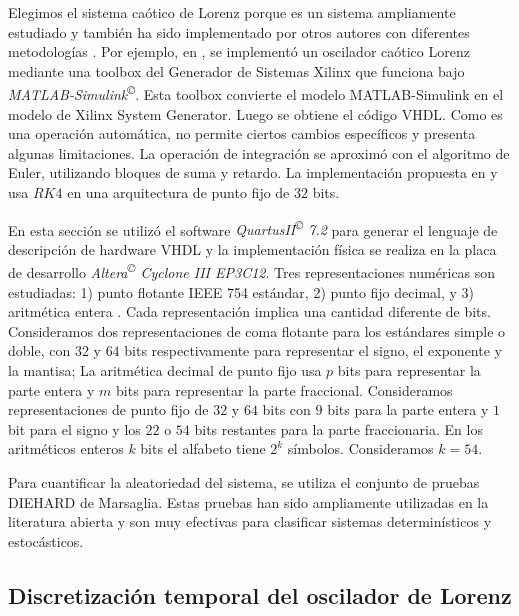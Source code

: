Elegimos el sistema caótico de Lorenz porque es un sistema ampliamente estudiado y también ha sido implementado por otros autores con diferentes metodologías \cite{Asseri2002, Azzaz2009, Azzaz2010}.
Por ejemplo, en \cite{Asseri2002}, se implementó un oscilador caótico Lorenz mediante una toolbox del Generador de Sistemas Xilinx que funciona bajo \textit{MATLAB-Simulink\textsuperscript{\copyright}}.
Esta toolbox convierte el modelo MATLAB-Simulink en el modelo de Xilinx System Generator.
Luego se obtiene el código VHDL.
Como es una operación automática, no permite ciertos cambios específicos y presenta algunas limitaciones.
La operación de integración se aproximó con el algoritmo de Euler, utilizando bloques de suma y retardo.
La implementación propuesta en \cite{Azzaz2009} y \cite{Azzaz2010} usa $RK4$ en una arquitectura de punto fijo de $32$ bits.

En esta sección se utilizó el software \textit{QuartusII\textsuperscript{\copyright} 7.2} para generar el lenguaje de descripción de hardware VHDL y la implementación física se realiza en la placa de desarrollo \textit{Altera\textsuperscript{\copyright} Cyclone III EP3C12}.
Tres representaciones numéricas son estudiadas:
1) punto flotante IEEE 754 estándar,
2) punto fijo decimal, y
3) aritmética entera \cite{Gonzalez2003}.
Cada representación implica una cantidad diferente de bits.
Consideramos dos representaciones de coma flotante para los estándares simple o doble, con $32$ y $64$ bits respectivamente para representar el signo, el exponente y la mantisa;
La aritmética decimal de punto fijo usa $p$ bits para representar la parte entera y $m$ bits para representar la parte fraccional.
Consideramos representaciones de punto fijo de $32$ y $64$ bits con $9$ bits para la parte entera y $1$ bit para el signo y los $22$ o $54$ bits restantes para la parte fraccionaria.
En los aritméticos enteros $k$ bits el alfabeto tiene $2^k$ símbolos.
Consideramos $k=54$.

Para cuantificar la aleatoriedad del sistema, se utiliza el conjunto de pruebas DIEHARD de Marsaglia.
Estas pruebas han sido ampliamente utilizadas en la literatura abierta y son muy efectivas para clasificar sistemas determinísticos y estocásticos.

\subsection{Discretización temporal del oscilador de Lorenz}
\label{sec:lorenzdigit}

